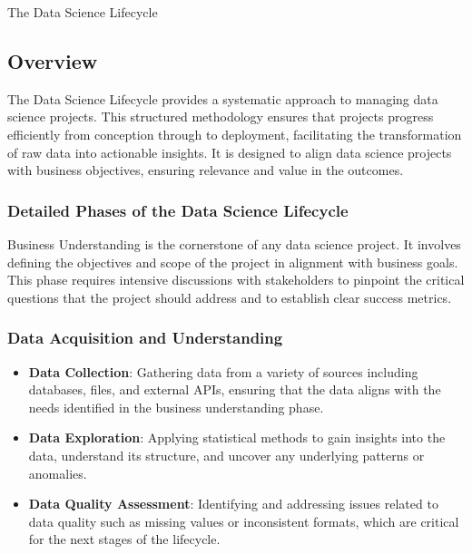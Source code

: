 \begin{notes}{The Data Science Lifecycle}
    \subsection*{Overview}

    The Data Science Lifecycle provides a systematic approach to managing data science projects. This structured methodology ensures that projects progress efficiently from conception through to 
    deployment, facilitating the transformation of raw data into actionable insights. It is designed to align data science projects with business objectives, ensuring relevance and value in the outcomes. \vspace*{1em}
    
    \subsubsection*{Detailed Phases of the Data Science Lifecycle}
    
    Business Understanding is the cornerstone of any data science project. It involves defining the objectives and scope of the project in alignment with business goals. This phase requires intensive 
    discussions with stakeholders to pinpoint the critical questions that the project should address and to establish clear success metrics. \vspace*{1em}
    
    \subsubsection*{Data Acquisition and Understanding}
    
    \begin{itemize}
        \item \textbf{Data Collection}: Gathering data from a variety of sources including databases, files, and external APIs, ensuring that the data aligns with the needs identified in the business understanding phase.
        \item \textbf{Data Exploration}: Applying statistical methods to gain insights into the data, understand its structure, and uncover any underlying patterns or anomalies.
        \item \textbf{Data Quality Assessment}: Identifying and addressing issues related to data quality such as missing values or inconsistent formats, which are critical for the next stages of the lifecycle.
    \end{itemize}
    

\end{notes}
